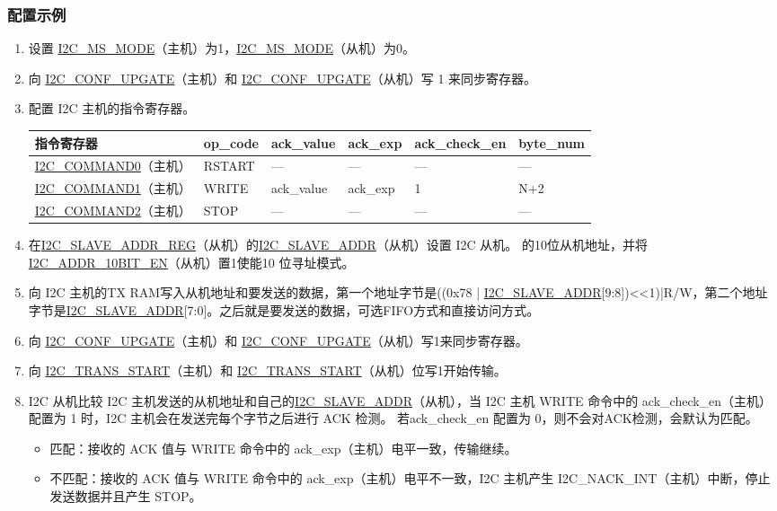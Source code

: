 \documentclass[main\_\_CN.tex]{subfiles}
\begin{document}
\subsubsection{配置示例}
\begin{enumerate}
\item 设置 \hyperref[fielddesc:I2CMSMODE]{I2C\_MS\_MODE}（主机）为1，\hyperref[fielddesc:I2CMSMODE]{I2C\_MS\_MODE}（从机）为0。
\item 向 \hyperref[fielddesc:I2CCONFUPGATE]{I2C\_CONF\_UPGATE}（主机）和 \hyperref[fielddesc:I2CCONFUPGATE]{I2C\_CONF\_UPGATE}（从机）写 1 来同步寄存器。
\item 配置 I2C 主机的指令寄存器。

\begin{longtable}{ | p{4cm} | p{2cm} | p{2cm} | p{2cm} |p{2cm} | p{2cm} |}
\hline\rowcolor{lightgray}
指令寄存器& op\_code & ack\_value&ack\_exp&ack\_check\_en&byte\_num  \\ \hline
\hyperref[fielddesc:I2CCOMMAND0]{I2C\_COMMAND0}（主机）& RSTART& ---&---&---&---  \\ \hline
\hyperref[fielddesc:I2CCOMMAND1]{I2C\_COMMAND1}（主机）& WRITE& ack\_value&ack\_exp&1&N+2  \\ \hline
\hyperref[fielddesc:I2CCOMMAND2]{I2C\_COMMAND2}（主机）& STOP& ---&---&---&---  \\ \hline
\end{longtable}

\item 在\hyperref[regdesc:I2CSLAVEADDRREG]{I2C\_SLAVE\_ADDR\_REG}（从机）的\hyperref[fielddesc:I2CSLAVEADDR]{I2C\_SLAVE\_ADDR}（从机）设置 I2C 从机。 的10位从机地址，并将 \hyperref[fielddesc:I2CADDR10BITEN]{I2C\_ADDR\_10BIT\_EN}（从机）置1使能10 位寻址模式。
\item 向 I2C 主机的TX RAM写入从机地址和要发送的数据，第一个地址字节是((0x78 | \hyperref[fielddesc:I2CSLAVEADDR]{I2C\_SLAVE\_ADDR}[9:8])<<1)|R/W，第二个地址字节是\hyperref[fielddesc:I2CSLAVEADDR]{I2C\_SLAVE\_ADDR}[7:0]。之后就是要发送的数据，可选FIFO方式和直接访问方式。
\item 向 \hyperref[fielddesc:I2CCONFUPGATE]{I2C\_CONF\_UPGATE}（主机）和 \hyperref[fielddesc:I2CCONFUPGATE]{I2C\_CONF\_UPGATE}（从机）写1来同步寄存器。
\item 向 \hyperref[fielddesc:I2CTRANSSTART]{I2C\_TRANS\_START}（主机）和 \hyperref[fielddesc:I2CTRANSSTART]{I2C\_TRANS\_START}（从机）位写1开始传输。
\item I2C 从机比较 I2C 主机发送的从机地址和自己的\hyperref[fielddesc:I2CSLAVEADDR]{I2C\_SLAVE\_ADDR}（从机），当 I2C 主机 WRITE 命令中的 ack\_check\_en（主机）配置为 1 时，I2C 主机会在发送完每个字节之后进行 ACK 检测。 若ack\_check\_en 配置为 0，则不会对ACK检测，会默认为匹配。
\begin{itemize}
\item 匹配：接收的 ACK 值与 WRITE 命令中的 ack\_exp（主机）电平一致，传输继续。
\item 不匹配：接收的 ACK 值与 WRITE 命令中的 ack\_exp（主机）电平不一致，I2C 主机产生 I2C\_NACK\_INT（主机）中断，停止发送数据并且产生 STOP。
\end{itemize}


\end{enumerate}
\end{document}
